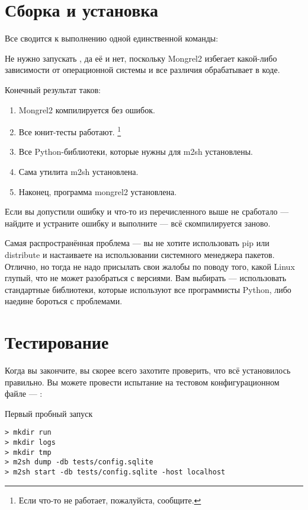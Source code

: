 \section{Сборка и установка}

Все сводится к выполнению одной единственной команды: 

Не нужно запускать , да её и нет, поскольку Mongrel2 избегает
какой-либо зависимости от операционной системы и все различия обрабатывает в коде.

Конечный результат таков:

\begin{enumerate}
\item Mongrel2 компилируется без ошибок.
\item Все юнит-тесты работают. \footnote{Если что-то не работает, пожалуйста, сообщите.}
\item Все Python-библиотеки, которые нужны для m2sh установлены.
\item Сама утилита m2sh установлена.
\item Наконец, программа mongrel2 установлена.
\end{enumerate}

Если вы допустили ошибку и что-то из перечисленного выше не сработало --- найдите
и устраните ошибку и выполните  --- всё скомпилируется
заново.

Самая распространённая проблема --- вы не хотите использовать pip или distribute
и настаиваете на использовании системного менеджера пакетов. Отлично, но тогда
не надо присылать свои жалобы по поводу того, какой Linux глупый, что не может
разобраться с версиями. Вам выбирать --- использовать стандартные библиотеки,
которые используют все программисты Python, либо наедине бороться с проблемами.

\section{Тестирование}

Когда вы закончите, вы скорее всего захотите проверить, что всё установилось
правильно. Вы можете провести испытание на тестовом конфигурационном файле ---
:

\begin{code}{Первый пробный запуск}
\begin{lstlisting}
> mkdir run
> mkdir logs
> mkdir tmp
> m2sh dump -db tests/config.sqlite
> m2sh start -db tests/config.sqlite -host localhost
\end{lstlisting}
\end{code}

